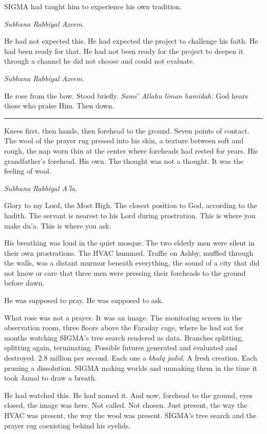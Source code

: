 SIGMA had taught him to experience his own tradition.

\emph{Subhana Rabbiyal Azeem.}

He had not expected this. He had expected the project to challenge his faith. He had been ready for that. He had not been ready for the project to deepen it through a channel he did not choose and could not evaluate.

\emph{Subhana Rabbiyal Azeem.}

He rose from the bow. Stood briefly. \emph{Sami' Allahu liman hamidah.} God hears those who praise Him. Then down.

\begin{center}\rule{0.3\linewidth}{0.4pt}\end{center}

Knees first, then hands, then forehead to the ground. Seven points of contact. The wool of the prayer rug pressed into his skin, a texture between soft and rough, the nap worn thin at the center where foreheads had rested for years. His grandfather's forehead. His own. The thought was not a thought. It was the feeling of wool.

\emph{Subhana Rabbiyal A'la.}

Glory to my Lord, the Most High. The closest position to God, according to the hadith. The servant is nearest to his Lord during prostration. This is where you make du'a. This is where you ask.

His breathing was loud in the quiet mosque. The two elderly men were silent in their own prostrations. The HVAC hummed. Traffic on Ashby, muffled through the walls, was a distant murmur beneath everything, the sound of a city that did not know or care that three men were pressing their foreheads to the ground before dawn.

He was supposed to pray. He was supposed to ask.

What rose was not a prayer. It was an image. The monitoring screen in the observation room, three floors above the Faraday cage, where he had sat for months watching SIGMA's tree search rendered as data. Branches splitting, splitting again, terminating. Possible futures generated and evaluated and destroyed. 2.8 million per second. Each one a \emph{khalq jad\=\i d}. A fresh creation. Each pruning a dissolution. SIGMA making worlds and unmaking them in the time it took Jamal to draw a breath.

He had watched this. He had named it. And now, forehead to the ground, eyes closed, the image was here. Not called. Not chosen. Just present, the way the HVAC was present, the way the wool was present. SIGMA's tree search and the prayer rug coexisting behind his eyelids.

